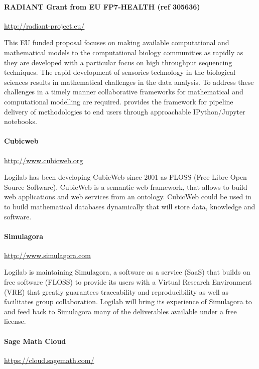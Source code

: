 \paragraph{RADIANT Grant from EU FP7-HEALTH (ref 305636)}
\url{http://radiant-project.eu/}

This EU funded proposal focuses on making available computational and
mathematical models to the computational biology communities as
rapidly as they are developed with a particular focus on high
throughput sequencing techniques. The rapid development of sensorics
technology in the biological sciences results in mathematical
challenges in the data analysis. To address these challenges in a
timely manner collaborative frameworks for mathematical and
computational modelling are required. \TheProject provides the
framework for pipeline delivery of methodologies to end users through
approachable IPython/Jupyter notebooks.


\paragraph{Cubicweb} \url{http://www.cubicweb.org}

Logilab has been developing CubicWeb since 2001 as FLOSS (Free Libre Open
Source Software). CubicWeb is a semantic web framework, that allows to
build web applications and web services from an ontology. CubicWeb
could be used in \TheProject to build mathematical databases dynamically
that will store data, knowledge and software.

\paragraph{Simulagora} \url{http://www.simulagora.com}

Logilab is maintaining Simulagora, a software as a service (SaaS) that builds
on free software (FLOSS) to provide its users with a Virtual Research Environment
(VRE) that greatly guarantees traceability and reproducibility as well as
facilitates group collaboration. Logilab will bring its experience of Simulagora
to \TheProject and feed back to Simulagora many of the deliverables available
under a free license.

\paragraph{Sage Math Cloud} \url{https://cloud.sagemath.com/}

